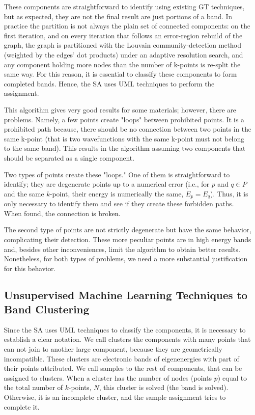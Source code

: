 \documentclass[a4paper,12pt]{report}
\begin{document}
\begin{appendices}
These components are straightforward to identify using existing GT techniques, but as expected, they are not the final result are just portions of a band.
In practice the partition is not always the plain set of connected components: on the first iteration, and on every iteration that follows an error-region rebuild of the graph, the graph is partitioned with the Louvain community-detection method (weighted by the edges' dot products) under an adaptive resolution search, and any component holding more nodes than the number of k-points is re-split the same way.
For this reason, it is essential to classify these components to form completed bands.
Hence, the SA uses UML techniques to perform the assignment.

This algorithm gives very good results for some materials; however, there are problems.
Namely, a few points create "loops" between prohibited points.
It is a prohibited path because, there should be no connection between two points in the same k-point (that is two wavefunctions with the same k-point must not belong to the same band).
This results in the algorithm assuming two components that should be separated as a single component.


Two types of points create these "loops."
One of them is straightforward to identify; they are degenerate points up to a numerical error
(i.e., for $p$ and $q \in P$ and the same $k$-point, their energy is numerically the same, $E_p=E_q$).
Thus, it is only necessary to identify them and see if they create these forbidden paths.
When found, the connection is broken.

The second type of points are not strictly degenerate but have the same behavior, complicating their detection.
These more peculiar points are in high energy bands and, besides other inconveniences, limit the algorithm to obtain better results.
Nonetheless, for both types of problems, we need a more substantial justification for this behavior.




\subsection{Unsupervised Machine Learning Techniques to Band Clustering}

Since the SA uses UML techniques to classify the components, it is necessary to establish a clear notation.
We call clusters the components with many points that can not join to another large component, because they are geometrically incompatible.
These clusters are electronic bands of eigenenergies with part of their points attributed.
We call samples to the rest of components, that can be assigned to clusters.
When a cluster has the number of nodes (points $p$) equal to the total number of $k$-points, $N$, this cluster is solved (the band is solved). Otherwise, it is an incomplete cluster, and the sample assignment tries to complete it.


\end{appendices}
\end{document}
